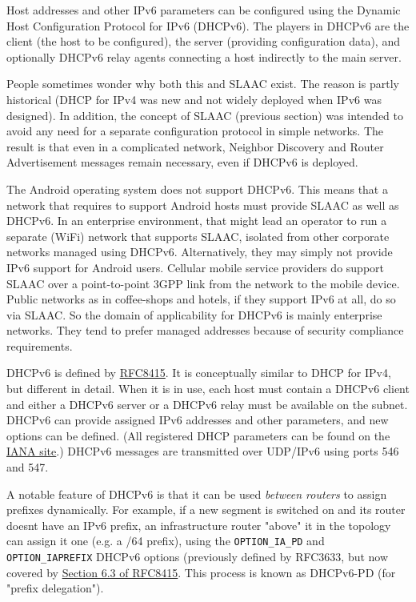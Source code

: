 \documentclass[
]{article}
\begin{document}
Host addresses and other IPv6 parameters can be configured using the
Dynamic Host Configuration Protocol for IPv6 (DHCPv6). The players in
DHCPv6 are the client (the host to be configured), the server (providing
configuration data), and optionally DHCPv6 relay agents connecting a
host indirectly to the main server.

People sometimes wonder why both this and SLAAC exist. The reason is
partly historical (DHCP for IPv4 was new and not widely deployed when
IPv6 was designed). In addition, the concept of SLAAC (previous section)
was intended to avoid any need for a separate configuration protocol in
simple networks. The result is that even in a complicated network,
Neighbor Discovery and Router Advertisement messages remain necessary,
even if DHCPv6 is deployed.

The Android operating system does not support DHCPv6. This means that a
network that requires to support Android hosts must provide SLAAC as
well as DHCPv6. In an enterprise environment, that might lead an
operator to run a separate (WiFi) network that supports SLAAC, isolated
from other corporate networks managed using DHCPv6. Alternatively, they
may simply not provide IPv6 support for Android users. Cellular mobile
service providers do support SLAAC over a point-to-point 3GPP link from
the network to the mobile device. Public networks as in coffee-shops and
hotels, if they support IPv6 at all, do so via SLAAC. So the domain of
applicability for DHCPv6 is mainly enterprise networks. They tend to
prefer managed addresses because of security compliance requirements.

DHCPv6 is defined by
\href{https://www.rfc-editor.org/info/rfc8415}{RFC8415}. It is
conceptually similar to DHCP for IPv4, but different in detail. When it
is in use, each host must contain a DHCPv6 client and either a DHCPv6
server or a DHCPv6 relay must be available on the subnet. DHCPv6 can
provide assigned IPv6 addresses and other parameters, and new options
can be defined. (All registered DHCP parameters can be found on the
\href{https://www.iana.org/assignments/dhcpv6-parameters/dhcpv6-parameters.xhtml\#dhcpv6-parameters-2}{IANA
site}.) DHCPv6 messages are transmitted over UDP/IPv6 using ports 546
and 547.

A notable feature of DHCPv6 is that it can be used \emph{between
routers} to assign prefixes dynamically. For example, if a new segment
is switched on and its router doesn\textquotesingle t have an IPv6
prefix, an infrastructure router "above" it in the topology can assign
it one (e.g. a /64 prefix), using the \texttt{OPTION\_IA\_PD} and
\texttt{OPTION\_IAPREFIX} DHCPv6 options (previously defined by RFC3633,
but now covered by
\href{https://www.rfc-editor.org/rfc/rfc8415.html\#section-6.3}{Section
6.3 of RFC8415}. This process is known as DHCPv6-PD (for "prefix
delegation").
\end{document}
